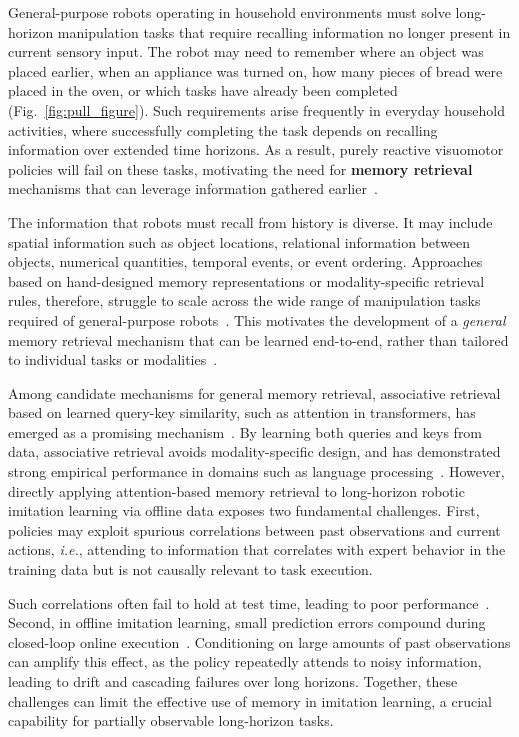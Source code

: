 
General-purpose robots operating in household environments must solve long-horizon manipulation tasks that require recalling information no longer present in current sensory input.
The robot may need to remember where an object was placed earlier, when an appliance was turned on, how many pieces of bread were placed in the oven, or which tasks have already been completed (Fig.~\ref{fig:pull_figure}).
Such requirements arise frequently in everyday household activities, where successfully completing the task depends on recalling information over extended time horizons.
As a result, purely reactive visuomotor policies will fail on these tasks, motivating the need for \textbf{memory retrieval} mechanisms that can leverage information gathered earlier~\cite{tulving1972episodic,atkinson1968human}.

The information that robots must recall from history is diverse.
It may include spatial information such as object locations, relational information between objects, numerical quantities, temporal events, or event ordering.
Approaches based on hand-designed memory representations or modality-specific retrieval rules, therefore, struggle to scale across the wide range of manipulation tasks required of general-purpose robots~\cite{guadarrama2014open, clipnav, sam2act}.
This motivates the development of a \textit{general} memory retrieval mechanism that can be learned end-to-end, rather than tailored to individual tasks or modalities~\cite{sukhbaatar2015end,graves2014neural,graves2016hybrid,lstm}.

Among candidate mechanisms for general memory retrieval, associative retrieval based on learned query-key similarity, such as attention in transformers, has emerged as a promising mechanism~\cite{carpenter1989neural,vaswani2017attention}.
By learning both queries and keys from data, associative retrieval avoids modality-specific design, and has demonstrated strong empirical performance in domains such as language processing~\cite{floridi2020gpt}.
However, directly applying attention-based memory retrieval to long-horizon robotic imitation learning via offline data exposes two fundamental challenges.
First, policies may exploit spurious correlations between past observations and current actions, \textit{i.e.}, attending to information that correlates with expert behavior in the training data but is not causally relevant to task execution.

Such correlations often fail to hold at test time, leading to poor performance~\cite{de2019causal,wen2020fighting}.
Second, in offline imitation learning, small prediction errors compound during closed-loop online execution~\cite{ross2011reduction,spencer2021feedback}. 
Conditioning on large amounts of past observations can amplify this effect, as the policy repeatedly attends to noisy information, leading to drift and cascading failures over long horizons.
Together, these challenges can limit the effective use of memory in imitation learning, a crucial capability for partially observable long-horizon tasks.


